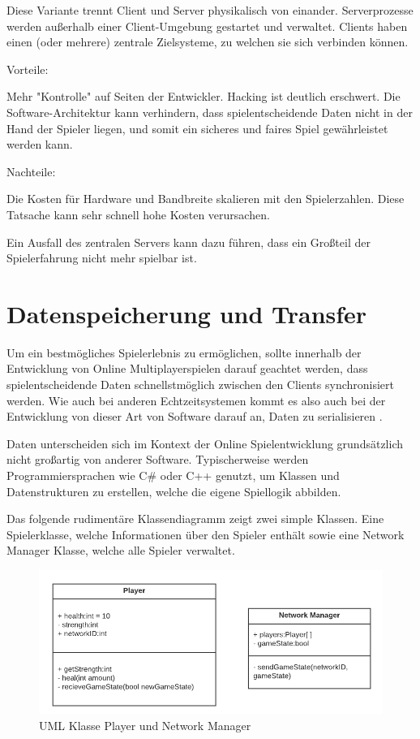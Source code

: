 Diese Variante trennt Client und Server physikalisch von einander. Serverprozesse werden außerhalb einer Client-Umgebung gestartet und verwaltet. Clients haben einen (oder mehrere) zentrale Zielsysteme, zu welchen sie sich verbinden können.

Vorteile: 

Mehr "Kontrolle" auf Seiten der Entwickler. Hacking ist deutlich erschwert. Die Software-Architektur kann verhindern, dass spielentscheidende Daten nicht in der Hand der Spieler liegen, und somit ein sicheres und faires Spiel gewährleistet werden kann.
\cite{Smed.2002}

Nachteile: 

Die Kosten für Hardware und Bandbreite skalieren mit den Spielerzahlen. Diese Tatsache kann sehr schnell hohe Kosten verursachen. \cite{Deng.2018}

Ein Ausfall des zentralen Servers kann dazu führen, dass ein Großteil der Spielerfahrung nicht mehr spielbar ist. 


\section{Datenspeicherung und Transfer}

Um ein bestmögliches Spielerlebnis zu ermöglichen, sollte innerhalb der Entwicklung von Online Multiplayerspielen darauf geachtet werden, dass spielentscheidende Daten schnellstmöglich zwischen den Clients synchronisiert werden. Wie auch bei anderen Echtzeitsystemen \cite{Wikipedia.2021} kommt es also auch bei der Entwicklung von dieser Art von Software darauf an, Daten zu serialisieren \cite{Wikipedia.2019}. 

Daten unterscheiden sich im Kontext der Online Spielentwicklung grundsätzlich nicht großartig von anderer Software. Typischerweise werden Programmiersprachen wie C\# oder C++ genutzt, um Klassen und Datenstrukturen zu erstellen, welche die eigene Spiellogik abbilden. \cite{Glinka.2008}

Das folgende rudimentäre Klassendiagramm zeigt zwei simple Klassen. Eine Spielerklasse, welche Informationen über den Spieler enthält sowie eine Network Manager Klasse, welche alle Spieler verwaltet.

\begin{figure}
	\centering
	\includegraphics[width=150mm]{images/UML_class_Player_NM.png}
	\caption[UML Klassen]{UML Klasse Player und Network Manager}
	\label{pic:UML_class_Player_NM}
\end{figure}


